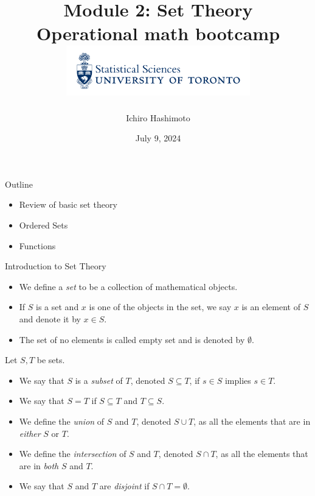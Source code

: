 \documentclass [aspectratio=169, handout]{beamer}
\title[]{Module 2: Set Theory \\ {\large Operational math bootcamp}\\ \includegraphics[width=8cm]{dept_logo.png}\vspace{-1em}}
\author[]{Ichiro Hashimoto}
\institute[]{University of Toronto}
\date{July 9, 2024}
\begin{document}
{
\begin{frame}
    \titlepage
\end{frame}
}

\begin{frame}{Outline}
    \begin{itemize}
    \setlength \itemsep{1em}
    	\item Review of basic set theory
	\item Ordered Sets
        \item Functions
    \end{itemize}
\end{frame}

\begin{frame}{Introduction to Set Theory}
\begin{itemize}
  \setlength\itemsep{1em}
\item We define a \emph{set} to be a collection of mathematical objects.
\item  If $S$ is a set and $x$ is one of the objects in the set, we say $x$ is an element of $S$ and denote it by $x\in S$.
\item The set of no elements is called empty set and is denoted by $\emptyset$.
\end{itemize}
\end{frame}

\begin{frame}
\begin{definition}
Let $S, T$ be sets. 
\begin{itemize}
    \item We say that $S$ is a \emph{subset} of $T$, denoted $S\subseteq T$, if $s\in S$ implies $s\in T$. 
    \item We say that $S=T$ if $S\subseteq T$ and $T\subseteq S$.
    \item We define the \emph{union} of $S$ and $T$, denoted $S \cup T$, as all the elements that are in \emph{either} $S$ or $T$.
    \item We define the \emph{intersection} of $S$ and $T$, denoted $S \cap T$, as all the elements that are in \emph{both} $S$ and $T$.
    \item We say that $S$ and $T$ are \emph{disjoint} if $S \cap T = \emptyset$.
\end{itemize}
\end{definition}
\end{frame}
\end{document}
